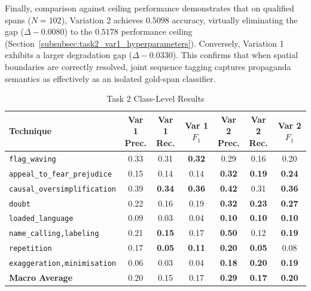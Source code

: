 \documentclass[12pt, a4paper]{article}
\begin{document}
Finally, comparison against ceiling performance demonstrates that on qualified spans ($N=102$), Variation 2 achieves $0.5098$ accuracy, virtually eliminating the gap ($\Delta -0.0080$) to the $0.5178$ performance ceiling (Section~\ref{subsubsec:task2_var1_hyperparameters}). Conversely, Variation 1 exhibits a larger degradation gap ($\Delta -0.0330$). This confirms that when spatial boundaries are correctly resolved, joint sequence tagging captures propaganda semantics as effectively as an isolated gold-span classifier.

\begin{table}[htbp]
  \centering
  \caption{Task 2 Class-Level Results}
  \label{tab:task2_class_level_results}
  \vspace{4pt}
  \scriptsize
  \setlength{\tabcolsep}{4pt}
  \begin{tabularx}{\textwidth}{X c c c c c c}
    \toprule
    \textbf{Technique} & \makecell{\textbf{Var 1}\\\textbf{Prec.}} & \makecell{\textbf{Var 1}\\\textbf{Rec.}} & \makecell{\textbf{Var 1}\\\textbf{$F_1$}} & \makecell{\textbf{Var 2}\\\textbf{Prec.}} & \makecell{\textbf{Var 2}\\\textbf{Rec.}} & \makecell{\textbf{Var 2}\\\textbf{$F_1$}} \\
    \midrule
    \texttt{flag\_waving} & 0.33 & 0.31 & \textbf{0.32} & 0.29 & 0.16 & 0.20 \\
    \addlinespace
    \texttt{appeal\_to\_fear\_prejudice} & 0.15 & 0.14 & 0.14 & \textbf{0.32} & \textbf{0.19} & \textbf{0.24} \\
    \addlinespace
    \texttt{causal\_oversimplification} & 0.39 & \textbf{0.34} & \textbf{0.36} & \textbf{0.42} & 0.31 & \textbf{0.36} \\
    \addlinespace
    \texttt{doubt} & 0.22 & 0.16 & 0.19 & \textbf{0.32} & \textbf{0.23} & \textbf{0.27} \\
    \addlinespace
    \texttt{loaded\_language} & 0.09 & 0.03 & 0.04 & \textbf{0.10} & \textbf{0.10} & \textbf{0.10} \\
    \addlinespace
    \texttt{name\_calling,labeling} & 0.21 & \textbf{0.15} & 0.17 & \textbf{0.50} & 0.12 & \textbf{0.19} \\
    \addlinespace
    \texttt{repetition} & 0.17 & \textbf{0.05} & \textbf{0.11} & \textbf{0.20} & \textbf{0.05} & 0.08 \\
    \addlinespace
    \texttt{exaggeration,minimisation} & 0.06 & 0.03 & 0.04 & \textbf{0.18} & \textbf{0.20} & \textbf{0.19} \\
    \midrule
    \textbf{Macro Average} & 0.20 & 0.15 & 0.17 & \textbf{0.29} & \textbf{0.17} & \textbf{0.20} \\
    \bottomrule
  \end{tabularx}
\end{table}
\end{document}
